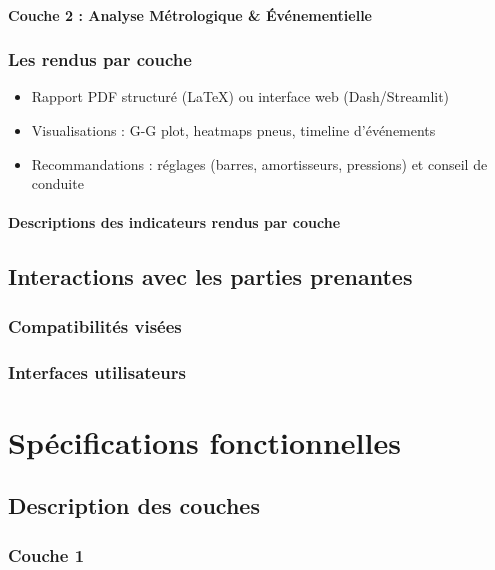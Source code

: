 \documentclass[a4paper,12pt]{report}
\begin{document}
\subsubsection{Couche 2 : Analyse Métrologique \& Événementielle}
\subsection{Les rendus par couche}

\begin{itemize}
    \item Rapport PDF structuré (LaTeX) ou interface web (Dash/Streamlit)
    \item Visualisations : G-G plot, heatmaps pneus, timeline d’événements
    \item Recommandations : réglages (barres, amortisseurs, pressions) et conseil de conduite
\end{itemize}

\subsubsection{Descriptions des indicateurs rendus par couche}

\section{Interactions avec les parties prenantes}

\subsection{Compatibilités visées}

\subsection{Interfaces utilisateurs}

\chapter{Spécifications fonctionnelles}

\section{Description des couches}

\subsection{Couche 1}
\end{document}
